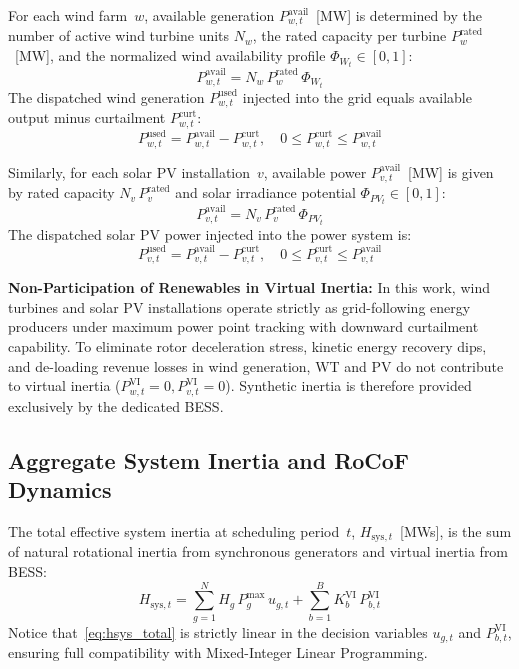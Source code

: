 \documentclass[journal]{IEEEtran}
\begin{document}
For each wind farm~$w$, available generation $P_{w,t}^{\text{avail}}$~[MW] is determined by the number of active wind turbine units $N_w$, the rated capacity per turbine $P_w^{\text{rated}}$~[MW], and the normalized wind availability profile $\Phi_{W_t} \in [0, 1]$:
\begin{equation}
  P_{w,t}^{\text{avail}} = N_w\,P_w^{\text{rated}}\,\Phi_{W_t}
  \label{eq:wt_avail}
\end{equation}
The dispatched wind generation $P_{w,t}^{\text{used}}$ injected into the grid equals available output minus curtailment $P_{w,t}^{\text{curt}}$:
\begin{equation}
  P_{w,t}^{\text{used}} = P_{w,t}^{\text{avail}} - P_{w,t}^{\text{curt}}, \quad 0 \leq P_{w,t}^{\text{curt}} \leq P_{w,t}^{\text{avail}}
  \label{eq:wt_used}
\end{equation}

Similarly, for each solar PV installation~$v$, available power $P_{v,t}^{\text{avail}}$~[MW] is given by rated capacity $N_v\,P_v^{\text{rated}}$ and solar irradiance potential $\Phi_{PV_t} \in [0, 1]$:
\begin{equation}
  P_{v,t}^{\text{avail}} = N_v\,P_v^{\text{rated}}\,\Phi_{PV_t}
  \label{eq:pv_avail}
\end{equation}
The dispatched solar PV power injected into the power system is:
\begin{equation}
  P_{v,t}^{\text{used}} = P_{v,t}^{\text{avail}} - P_{v,t}^{\text{curt}}, \quad 0 \leq P_{v,t}^{\text{curt}} \leq P_{v,t}^{\text{avail}}
  \label{eq:pv_used}
\end{equation}

\textbf{Non-Participation of Renewables in Virtual Inertia:}
In this work, wind turbines and solar PV installations operate strictly as grid-following energy producers under maximum power point tracking with downward curtailment capability. To eliminate rotor deceleration stress, kinetic energy recovery dips, and de-loading revenue losses in wind generation, WT and PV do not contribute to virtual inertia ($P_{w,t}^{\text{VI}} = 0, P_{v,t}^{\text{VI}} = 0$). Synthetic inertia is therefore provided exclusively by the dedicated BESS.

\subsection{Aggregate System Inertia and RoCoF Dynamics}

The total effective system inertia at scheduling period~$t$, $H_{\text{sys},t}$~[MWs], is the sum of natural rotational inertia from synchronous generators and virtual inertia from BESS:
\begin{equation}
  H_{\text{sys},t} = \sum_{g=1}^{N} H_g\,P_g^{\max}\,u_{g,t} + \sum_{b=1}^{B} K_b^{\text{VI}}\,P_{b,t}^{\text{VI}}
  \label{eq:hsys_total}
\end{equation}
Notice that~\eqref{eq:hsys_total} is strictly linear in the decision variables $u_{g,t}$ and $P_{b,t}^{\text{VI}}$, ensuring full compatibility with Mixed-Integer Linear Programming.
\end{document}
